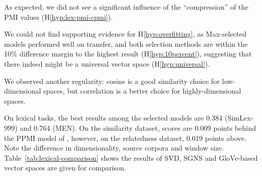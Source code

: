 As expected, we did not see a significant influence of the ``compression'' of the PMI values (H\ref{hyp:lex-pmi-cpmi}).

We could not find supporting evidence for H\ref{hyp:overfitting}, as Max-selected models performed well on transfer, and both selection methods are within the 10\% difference margin to the highest result (H\ref{hyp:10percent}), suggesting that there indeed might be a universal vector space (H\ref{hyp:universal}).

We observed another regularity: cosine is a good similarity choice for low-dimensional spaces, but correlation is a better choice for highly-dimensional spaces.


On lexical tasks, the best results among the selected models are 0.384 (SimLex-999) and 0.764 (MEN). On the similarity dataset, scores are 0.009 points behind the PPMI model of , however, on the relatedness dataset, 0.019 points above. Note the difference in dimensionality, source corpora and window size. Table~\ref{tab:lexical-comparison} shows the results of SVD, SGNS and GloVe-based vector spaces are given for comparison.


